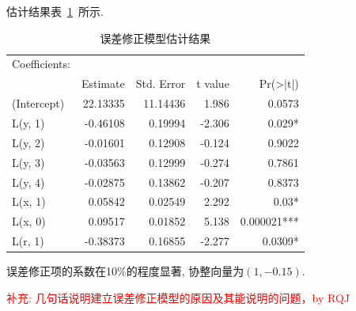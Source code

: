 估计结果表~\ref{tab:coin-correction-model}~所示.
\begin{table}[ht]
    \centering
    \caption{误差修正模型估计结果}
    \label{tab:coin-correction-model}
    \begin{tabular}{l | rrrr}
        Coefficients: &          &            &         &                     \\
                      & Estimate & Std. Error & t value & Pr(\textgreater|t|) \\  \hline
        (Intercept)   & 22.13335 & 11.14436   & 1.986   & 0.0573              \\
        L(y, 1)       & -0.46108 & 0.19994    & -2.306  & 0.029*             \\
        L(y, 2)       & -0.01601 & 0.12908    & -0.124  & 0.9022              \\
        L(y, 3)       & -0.03563 & 0.12999    & -0.274  & 0.7861              \\
        L(y, 4)       & -0.02875 & 0.13862    & -0.207  & 0.8373              \\
        L(x, 1)       & 0.05842  & 0.02549    & 2.292   & 0.03*              \\
        L(x, 0)       & 0.09517  & 0.01852    & 5.138   & 0.000021***        \\
        L(r, 1)       & -0.38373 & 0.16855    & -2.277  & 0.0309*
    \end{tabular}
\end{table}


误差修正项的系数在10\%的程度显著, 协整向量为$(1, -0.15)$.

\textcolor{red}{补充: 几句话说明建立误差修正模型的原因及其能说明的问题，by RQJ}
